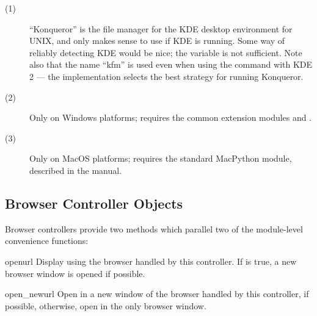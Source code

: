 \begin{description}
\item[(1)]
``Konqueror'' is the file manager for the KDE desktop environment for
UNIX, and only makes sense to use if KDE is running.  Some way of
reliably detecting KDE would be nice; the  variable is
not sufficient.  Note also that the name ``kfm'' is used even when
using the  command with KDE 2 --- the
implementation selects the best strategy for running Konqueror.

\item[(2)]
Only on Windows platforms; requires the common
extension modules  and .

\item[(3)]
Only on MacOS platforms; requires the standard MacPython 
module, described in the  manual.
\end{description}


\subsection{Browser Controller Objects \label{browser-controllers}}

Browser controllers provide two methods which parallel two of the
module-level convenience functions:

\begin{funcdesc}{open}{url}
  Display  using the browser handled by this controller.  If
   is true, a new browser window is opened if possible.
\end{funcdesc}

\begin{funcdesc}{open_new}{url}
  Open  in a new window of the browser handled by this
  controller, if possible, otherwise, open  in the only
  browser window.
\end{funcdesc}
